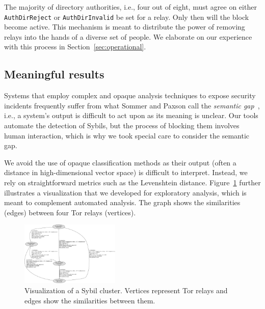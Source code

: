 The majority of directory authorities, i.e., four out of eight, must agree on
either \texttt{AuthDirReject} or \texttt{AuthDirInvalid} be set for a relay.
Only then will the block become active.  This mechanism is meant to distribute
the power of removing relays into the hands of a diverse set of people.  We
elaborate on our experience with this process in Section~\ref{sec:operational}.

\subsection{Meaningful results}
Systems that employ complex and opaque analysis techniques to expose security
incidents frequently suffer from what Sommer and Paxson call the \emph{semantic
gap}~\cite[\S III.C]{Sommer2010a}, i.e., a system's output is difficult to act
upon as its meaning is unclear.  Our tools automate the detection of Sybils,
but the process of blocking them involves human interaction, which is why we
took special care to consider the semantic gap.

We avoid the use of opaque classification methods as their output (often a
distance in high-dimensional vector space) is difficult to interpret.  Instead,
we rely on straightforward metrics such as the Levenshtein distance.
Figure~\ref{fig:visualization} further illustrates a visualization that we
developed for exploratory analysis, which is meant to complement automated
analysis.  The graph shows the similarities (edges) between four Tor relays
(vertices).

\begin{figure}[t]
	\centering
	\includegraphics[width=0.42\textwidth]{diagrams/visualization.pdf}
    \caption{Visualization of a Sybil cluster.  Vertices represent Tor relays
    and edges show the similarities between them.}
	\label{fig:visualization}
\end{figure}
